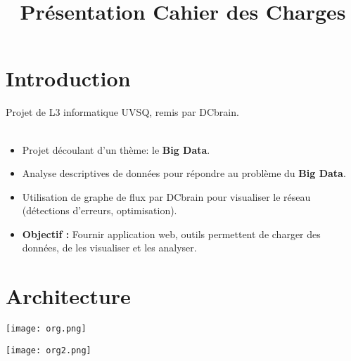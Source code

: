 
\usepackage{../tex/myInfolines}
\usepackage{longtable,array}
\title{Présentation Cahier des Charges}



	\begin{frame}
		\titlepage
	\end{frame}
	
	\section{Introduction}
		\begin{frame}
			Projet de L3 informatique UVSQ, remis par DCbrain.\\~\\
		\begin{itemize}
		\item Projet découlant d'un thème: le \textbf{Big Data}.\vspace{0.4cm}
		\item Analyse descriptives de données pour répondre au problème du \textbf{Big Data}.\vspace{0.4cm}
		\item Utilisation de graphe de flux par DCbrain pour visualiser le réseau (détections d'erreurs, optimisation).\vspace{0.4cm}
		\item \textbf{Objectif :} Fournir application web, outils permettent de charger des données, de les visualiser et les analyser.
		\end{itemize}
		\end{frame}
	
	\section{Architecture}
	\begin{frame}
		\begin{center}\texttt{[image: org.png]}\end{center}
	\end{frame}		
	
	\begin{frame}
		\begin{center}\texttt{[image: org2.png]}\end{center}
	\end{frame}
	
